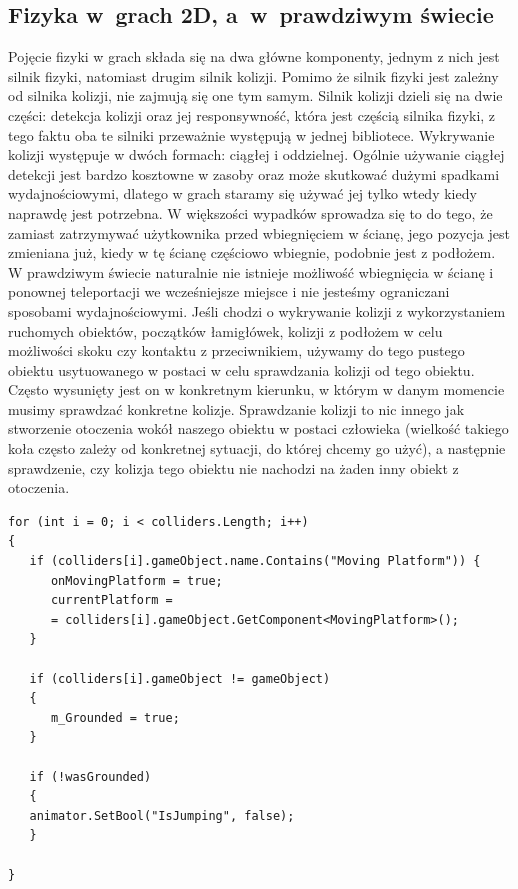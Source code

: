 \documentclass[oneside,polski,logo]{amuthesis}
\begin{document}
\subsection{Fizyka w~grach 2D, a~w~prawdziwym świecie}
Pojęcie fizyki w grach składa się na dwa główne komponenty, jednym z nich jest silnik fizyki, natomiast drugim silnik kolizji. Pomimo że silnik fizyki jest zależny od silnika kolizji, nie zajmują się one tym samym.
Silnik kolizji dzieli się na dwie części: detekcja kolizji oraz jej responsywność, która jest częścią silnika fizyki, z tego faktu oba te silniki przeważnie występują w jednej bibliotece. Wykrywanie kolizji występuje w dwóch formach: ciągłej i oddzielnej. Ogólnie używanie ciągłej detekcji jest bardzo kosztowne w zasoby oraz może skutkować dużymi spadkami wydajnościowymi, dlatego w grach staramy się używać jej tylko wtedy kiedy naprawdę jest potrzebna. W większości wypadków sprowadza się to do tego, że zamiast zatrzymywać użytkownika przed wbiegnięciem w ścianę, jego pozycja jest zmieniana już, kiedy w tę ścianę częściowo wbiegnie, podobnie jest z podłożem. W prawdziwym świecie naturalnie nie istnieje możliwość wbiegnięcia w ścianę i ponownej teleportacji we wcześniejsze miejsce i nie jesteśmy ograniczani sposobami wydajnościowymi. Jeśli chodzi o wykrywanie kolizji z wykorzystaniem ruchomych obiektów, początków łamigłówek, kolizji z podłożem w celu możliwości skoku czy kontaktu z przeciwnikiem, używamy do tego pustego obiektu usytuowanego w postaci w celu sprawdzania kolizji od tego obiektu. Często wysunięty jest on w konkretnym kierunku, w którym w danym momencie musimy sprawdzać konkretne kolizje. Sprawdzanie kolizji to nic innego jak stworzenie otoczenia wokół naszego obiektu w postaci człowieka (wielkość takiego koła często zależy od konkretnej sytuacji, do której chcemy go użyć), a następnie sprawdzenie, czy kolizja tego obiektu nie nachodzi na żaden inny obiekt z otoczenia. \cite{physics1}


\begin{lstlisting}[breaklines=true,
language={[Sharp]C},
rulecolor=\color{blue!80!black},
caption={Fragment klasy \texttt{CharacterController.cs}}
]
for (int i = 0; i < colliders.Length; i++)
{
   if (colliders[i].gameObject.name.Contains("Moving Platform")) {
      onMovingPlatform = true;
      currentPlatform = 
      = colliders[i].gameObject.GetComponent<MovingPlatform>();
   }

   if (colliders[i].gameObject != gameObject)
   {
      m_Grounded = true;
   }

   if (!wasGrounded)
   {
   animator.SetBool("IsJumping", false);
   }

}
\end{lstlisting}
\end{document}
